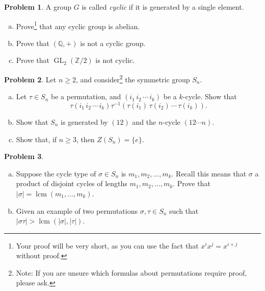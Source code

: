 \documentclass[11pt]{article}
\DeclareMathOperator{\lcm}{lcm}
\theoremstyle{definition}
\newtheorem{problem}{Problem}
\begin{document}
\begin{problem}
	A group $G$ is called {\it cyclic} if it is generated by a single element. 
	
	\begin{enumerate}[(a)]
		\item Prove\footnote{Your proof will be very short, as you can use the fact that $x^ix^j = x^{i+j}$ without proof.} that any cyclic group is abelian. 
	
		\item Prove that $(\mathbb Q, +)$ is not a cyclic group.
	\item Prove that $\operatorname{GL}_2(\mathbb Z/2)$ is not cyclic.
	\end{enumerate}
\end{problem}


\begin{problem} Let $n\geq 2$, and consider\footnote{Note: If you are unsure which formulas about permutations require proof, please ask.} the symmetric group $S_n$.
\begin{enumerate}[(a)]
\item Let $\tau\in S_n$ be a permutation, and $(i_1 \, i_2 \, \cdots \, i_k)$ be a $k$-cycle. Show that 
\[ \tau (i_1 \, i_2 \, \cdots \, i_k)  \tau^{-1} (\tau(i_1) \, \tau(i_2) \, \cdots \, \tau(i_k)).\]
\item Show that $S_n$ is generated by $(12)$ and the $n$-cycle $(12 \cdots n)$.
\item Show that, if $n\geq 3$, then $Z(S_n) = \{e\}$.
\end{enumerate}
\end{problem}



\begin{problem}
	\begin{enumerate}[(a)]
\item Suppose the cycle type of $\sigma \in S_n$ is $m_1, m_2, \ldots, m_k$. Recall this means that $\sigma$ a product of disjoint cycles of lengths $m_1, m_2, \ldots, m_k$. Prove that $|\sigma| = \lcm(m_1, \ldots, m_k)$. 
\item Given an example of two permutations $\sigma, \tau \in S_n$ such that $|\sigma\tau| > \lcm(|\sigma|,|\tau|)$.
\end{enumerate}
\end{problem}
\end{document}
